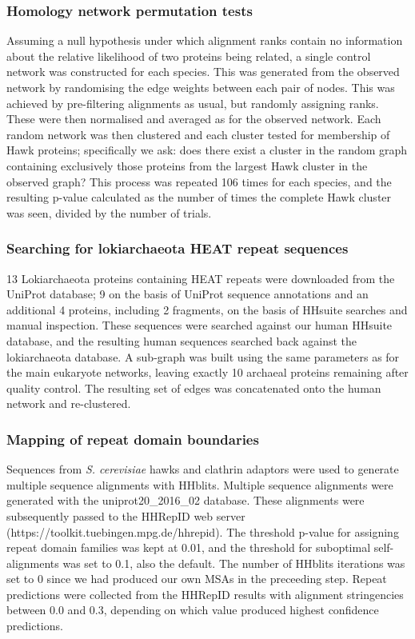 \documentclass[a4paper,11pt,twoside,openright]{scrbook}
\begin{document}
\subsubsection{Homology network permutation tests}
Assuming a null hypothesis under which alignment ranks contain no information about the relative likelihood of two proteins being related, a single control network was constructed for each species. This was generated from the observed network by randomising the edge weights between each pair of nodes. This was achieved by pre-filtering alignments as usual, but randomly assigning ranks. These were then normalised and averaged as for the observed network. Each random network was then clustered and each cluster tested for membership of Hawk proteins; specifically we ask: does there exist a cluster in the random graph containing exclusively those proteins from the largest Hawk cluster in the observed graph? This process was repeated 106 times for each species, and the resulting p-value calculated as the number of times the complete Hawk cluster was seen, divided by the number of trials.

\subsubsection{Searching for lokiarchaeota HEAT repeat sequences}
13 Lokiarchaeota proteins containing HEAT repeats were downloaded from the UniProt database; 9 on the basis of UniProt sequence annotations and an additional 4 proteins, including 2 fragments, on the basis of HHsuite searches and manual inspection. These sequences were searched against our human HHsuite database, and the resulting human sequences searched back against the lokiarchaeota database. A sub-graph was built using the same parameters as for the main eukaryote networks, leaving exactly 10 archaeal proteins remaining after quality control. The resulting set of edges was concatenated onto the human network and re-clustered.

\subsubsection{Mapping of repeat domain boundaries}
Sequences from \textit{S. cerevisiae} hawks and clathrin adaptors were used to generate multiple sequence alignments with HHblits. Multiple sequence alignments were generated with the uniprot20\_2016\_02 database. These alignments were subsequently passed to the HHRepID web server \newline (https://toolkit.tuebingen.mpg.de/hhrepid). The threshold p-value for assigning repeat domain families was kept at 0.01, and the threshold for suboptimal self-alignments was set to 0.1, also the default. The number of HHblits iterations was set to 0 since we had produced our own MSAs in the preceeding step. Repeat predictions were collected from the HHRepID results with alignment stringencies between 0.0 and 0.3, depending on which value produced highest confidence predictions.
\end{document}
